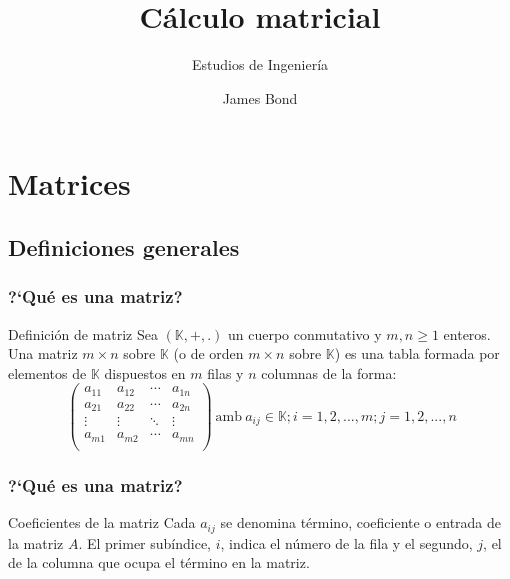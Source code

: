 \documentclass[12pt]{article}
\title[Tema 1 - Matrices, sistemas y determinantes]{C\'{a}lculo matricial}
\subtitle{Estudios de Ingenier\'ia}
\author[James Bond]{
James Bond%
}
\date{}
\begin{document}
 

\frame{\titlepage}


\section{Matrices}
\subsection{Definiciones generales}



\begin{frame}
  \frametitle{?`Qu\'e es una matriz?}
  \begin{block}{Definici\'{o}n de matriz}
Sea $(\mathbb{K}, +, .)$ un cuerpo conmutativo y $m, n \geq 1$ enteros. Una matriz $m \times n$ sobre $\mathbb{K}$ (o de orden $m \times n$ sobre $\mathbb{K}$) es una tabla formada por elementos de $\mathbb{K}$ dispuestos en $m$ filas y $n$ columnas de la forma:
\[\   \left(\begin{matrix} %
      a_{11} & a_{12} & \cdots & a_{1n} \\
 a_{21} & a_{22} & \cdots & a_{2n} \\
  \vdots & \vdots & \ddots & \vdots \\
   a_{m1} & a_{m2} & \cdots & a_{mn} \\
    \end{matrix}\right)
    \ \mathrm{amb}\ a_{ij} \in \mathbb{K}; i=1,2,...,m; j =1,2,...,n\]

  \end{block}
\end{frame}


\begin{frame}
  \frametitle{?`Qu\'{e} es una matriz?}   
  \begin{block}{Coeficientes de la matriz}
Cada $a_{ij}$ se denomina t\'ermino, coeficiente o entrada de la matriz $A$. El primer sub\'indice, $i$, indica el n\'umero de la fila y el segundo, $j$, el de la columna que ocupa el t\'ermino en la matriz.
  \end{block}
\end{frame}

\end{document}
